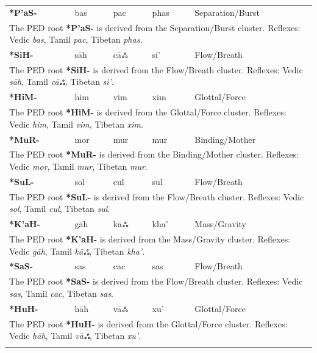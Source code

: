 \begin{longtable}{p{} p{} p{} p{} p{}}
\textbf{*P'aS-} & bas & pac & phas & Separation/Burst \\ 
\multicolumn{5}{p{\textwidth}}{\small The PED root \textbf{*P'aS-} is derived from the Separation/Burst cluster. Reflexes: Vedic \textit{bas}, Tamil \textit{pac}, Tibetan \textit{phas}. } \\ \addlinespace 
\textbf{*SiH-} & sāh & cāஃ & si' & Flow/Breath \\ 
\multicolumn{5}{p{\textwidth}}{\small The PED root \textbf{*SiH-} is derived from the Flow/Breath cluster. Reflexes: Vedic \textit{sāh}, Tamil \textit{cāஃ}, Tibetan \textit{si'}. } \\ \addlinespace 
\textbf{*HiM-} & him & vim & xim & Glottal/Force \\ 
\multicolumn{5}{p{\textwidth}}{\small The PED root \textbf{*HiM-} is derived from the Glottal/Force cluster. Reflexes: Vedic \textit{him}, Tamil \textit{vim}, Tibetan \textit{xim}. } \\ \addlinespace 
\textbf{*MuR-} & mor & mur & mur & Binding/Mother \\ 
\multicolumn{5}{p{\textwidth}}{\small The PED root \textbf{*MuR-} is derived from the Binding/Mother cluster. Reflexes: Vedic \textit{mor}, Tamil \textit{mur}, Tibetan \textit{mur}. } \\ \addlinespace 
\textbf{*SuL-} & sol & cul & sul & Flow/Breath \\ 
\multicolumn{5}{p{\textwidth}}{\small The PED root \textbf{*SuL-} is derived from the Flow/Breath cluster. Reflexes: Vedic \textit{sol}, Tamil \textit{cul}, Tibetan \textit{sul}. } \\ \addlinespace 
\textbf{*K'aH-} & gāh & kāஃ & kha' & Mass/Gravity \\ 
\multicolumn{5}{p{\textwidth}}{\small The PED root \textbf{*K'aH-} is derived from the Mass/Gravity cluster. Reflexes: Vedic \textit{gāh}, Tamil \textit{kāஃ}, Tibetan \textit{kha'}. } \\ \addlinespace 
\textbf{*SaS-} & sas & cac & sas & Flow/Breath \\ 
\multicolumn{5}{p{\textwidth}}{\small The PED root \textbf{*SaS-} is derived from the Flow/Breath cluster. Reflexes: Vedic \textit{sas}, Tamil \textit{cac}, Tibetan \textit{sas}. } \\ \addlinespace 
\textbf{*HuH-} & hāh & vāஃ & xu' & Glottal/Force \\ 
\multicolumn{5}{p{\textwidth}}{\small The PED root \textbf{*HuH-} is derived from the Glottal/Force cluster. Reflexes: Vedic \textit{hāh}, Tamil \textit{vāஃ}, Tibetan \textit{xu'}. } \\ \addlinespace 

\end{longtable}
